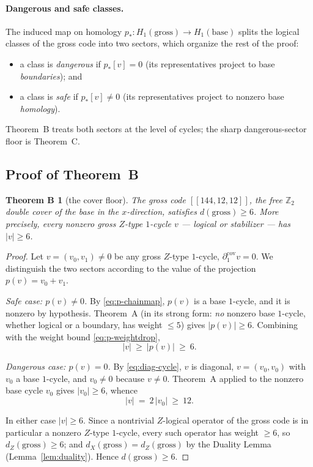 \documentclass[11pt]{article}
\newcommand{\Z}{\mathbb{Z}}
\newcommand{\wt}[1]{\lvert #1\rvert}
\theoremstyle{plain}
\newtheorem*{thmB}{Theorem B}
\theoremstyle{definition}
\theoremstyle{remark}
\begin{document}
\paragraph{Dangerous and safe classes.}
The induced map on homology $p_\ast\colon H_1(\mathrm{gross})\to H_1(\mathrm{base})$ splits
the logical classes of the gross code into two sectors, which organize the rest of the
proof:
\begin{itemize}
  \item a class is \emph{dangerous} if $p_\ast[v]=0$ (its representatives project to base
        \emph{boundaries}); and
  \item a class is \emph{safe} if $p_\ast[v]\ne0$ (its representatives project to nonzero
        base \emph{homology}).
\end{itemize}
Theorem~B treats both sectors at the level of cycles; the sharp dangerous-sector floor is
Theorem~C.

\subsection{Proof of Theorem~B}

\begin{thmB}[the cover floor]
The gross code $[[144,12,12]]$, the free $\Z_2$ double cover of the base in the
$x$-direction, satisfies $d(\mathrm{gross})\ge 6$. More precisely, every nonzero gross
$Z$-type $1$-cycle $v$ --- logical or stabilizer --- has $\wt{v}\ge 6$.
\end{thmB}

\begin{proof}
Let $v=(v_0,v_1)\ne 0$ be any gross $Z$-type $1$-cycle,
$\partial_1^{\mathrm{cov}}v=0$. We distinguish the two sectors according to the value of
the projection $p(v)=v_0+v_1$.

\emph{Safe case: $p(v)\ne 0$.} By \eqref{eq:p-chainmap}, $p(v)$ is a base $1$-cycle, and
it is nonzero by hypothesis. Theorem~A (in its strong form: \emph{no} nonzero base
$1$-cycle, whether logical or a boundary, has weight $\le 5$) gives $\wt{p(v)}\ge 6$.
Combining with the weight bound \eqref{eq:p-weightdrop},
\[
  \wt{v}\ \ge\ \wt{p(v)}\ \ge\ 6 .
\]

\emph{Dangerous case: $p(v)=0$.} By \eqref{eq:diag-cycle}, $v$ is diagonal,
$v=(v_0,v_0)$ with $v_0$ a base $1$-cycle, and $v_0\ne 0$ because $v\ne 0$. Theorem~A
applied to the nonzero base cycle $v_0$ gives $\wt{v_0}\ge 6$, whence
\[
  \wt{v}\ =\ 2\,\wt{v_0}\ \ge\ 12 .
\]

In either case $\wt{v}\ge 6$. Since a nontrivial $Z$-logical operator of the gross code is
in particular a nonzero $Z$-type $1$-cycle, every such operator has weight $\ge 6$, so
$d_Z(\mathrm{gross})\ge 6$; and $d_X(\mathrm{gross})=d_Z(\mathrm{gross})$ by the Duality
Lemma (Lemma~\ref{lem:duality}). Hence $d(\mathrm{gross})\ge 6$.
\end{proof}
\end{document}
